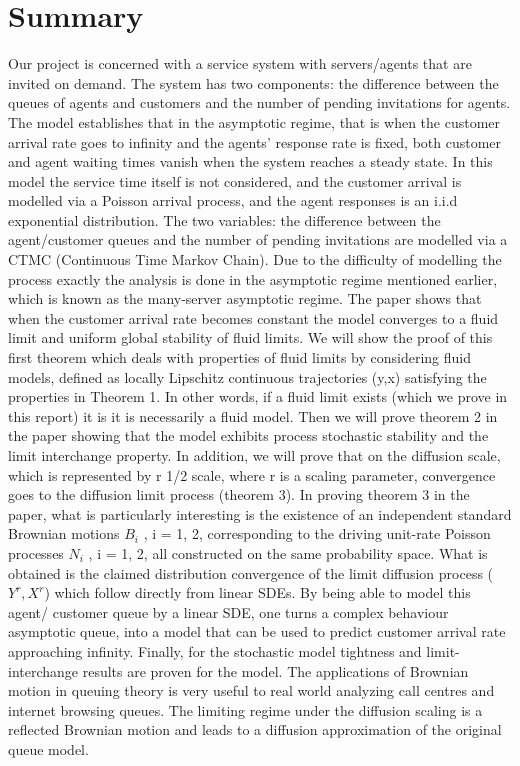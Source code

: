 	\section{Summary}
Our project is concerned with a service system with servers/agents that are invited on demand. The system has two components: the difference between the queues of agents and customers and the number of pending invitations for agents. The model establishes that in the asymptotic regime, that is when the customer arrival rate goes to infinity and the agents’ response rate is fixed, both customer and agent waiting times vanish when the system reaches a steady state. In this model the service time itself is not considered, and the customer arrival is modelled via a Poisson arrival process, and the agent responses is an i.i.d exponential distribution. The two variables: the difference between the agent/customer queues and the number of pending invitations are modelled via a CTMC (Continuous Time Markov Chain). Due to the difficulty of modelling the process exactly the analysis is done in the asymptotic regime mentioned earlier, which is known as the many-server asymptotic regime. \newline\newline
The paper shows that when the customer arrival rate becomes constant the model converges to a fluid limit and uniform global stability of fluid limits. We will show the proof of this first theorem which deals with properties of fluid limits by considering fluid models, defined as locally Lipschitz continuous trajectories (y,x) satisfying the properties in Theorem 1. In other words, if a fluid limit exists (which we prove in this report) it is it is necessarily a fluid model. Then we will prove theorem 2 in the paper showing that the model exhibits process stochastic stability and the limit interchange property. In addition, we will prove that on the diffusion scale, which is represented by r 1/2 scale, where r is a scaling parameter, convergence goes to the diffusion limit process (theorem 3). In proving theorem 3 in the paper, what is particularly interesting is the existence of an independent standard Brownian motions $B_i$ , i = 1, 2, corresponding to the driving unit-rate Poisson processes $N_i$ , i = 1, 2, all constructed on the same probability space. What is obtained is the claimed distribution convergence of the limit diffusion process ($Y^r , X^r$) which follow directly from linear SDEs. By being able to model this agent/ customer queue by  a linear SDE, one turns a complex behaviour asymptotic queue, into a model that can be used to predict customer arrival rate approaching infinity. Finally, for the stochastic model tightness and limit-interchange results are proven for the model. The applications of Brownian motion in queuing theory is very useful to real world analyzing call centres and internet browsing queues. The limiting regime under the diffusion scaling is a reflected Brownian motion and leads to a diffusion approximation of the original queue model.\newline\newline
